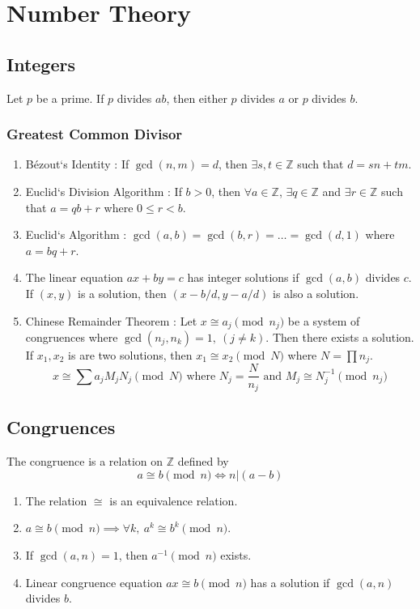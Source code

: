 \chapter{Number Theory}
\section{Integers}
\begin{lemma}[Euclid]
	Let $p$ be a prime. If $p$ divides $ab$, then either $p$ divides $a$ or $p$ divides $b$.
\end{lemma}

\subsection{Greatest Common Divisor}
\begin{enumerate}
	\item B\'ezout`s Identity : If $\gcd(n,m)= d$, then $\exists s,t \in \mathbb{Z}$ such that $d = sn+tm$.
	\item Euclid`s Division Algorithm : If $b > 0$, then $\forall a \in \mathbb{Z}$, $\exists q \in \mathbb{Z}$ and $\exists r \in \mathbb{Z}$ such that $a = qb+r$ where $0 \le r < b$.
	\item Euclid`s Algorithm : $\gcd(a,b) = \gcd(b,r) = \dots = \gcd(d,1)$ where $a = bq+r$.
	\item The linear equation $ax+by=c$ has integer solutions if $\gcd(a,b)$ divides $c$.\\ If $(x,y)$ is a solution, then $(x-b/d,y-a/d)$ is also a solution.
	\item Chinese Remainder Theorem : Let $x \cong a_j \pmod{n_j}$ be a system of congruences where $\gcd(n_j,n_k) = 1,\ (j \ne k)$. Then there exists a solution.\\ If $x_1,x_2$ is are two solutions, then $x_1 \cong x_2 \pmod{N}$ where $N = \prod n_j$.
		$$x \cong \sum a_j M_j N_j \pmod{N} \text{ where } N_j = \frac{N}{n_j} \text{ and } M_j \cong N_j^{-1} \pmod{n_j}$$
\end{enumerate}

\section{Congruences}
\begin{definition}
	The congruence is a relation on $\mathbb{Z}$ defined by
	$$a \cong b \pmod{n} \iff n | (a-b)$$
\end{definition}
\begin{enumerate}
	\item The relation $\cong$ is an equivalence relation.
	\item $a \cong b \pmod{n} \implies \forall k,\ a^k \cong b^k \pmod{n}$.
	\item If $\gcd(a,n) = 1$, then $a^{-1} \pmod{n}$ exists.
	\item Linear congruence equation $ax \cong b \pmod{n}$ has a solution if $\gcd(a,n)$ divides $b$.
\end{enumerate}

